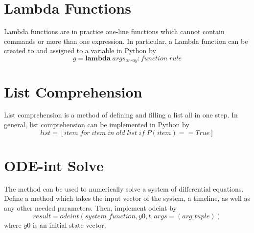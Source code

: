 \documentclass[12pt]{report}
\begin{document}
\begin{appendices}
        \section{Lambda Functions}

        \begin{defn}{}{}
                Lambda functions are in practice one-line functions which cannot contain commands or more than one expression. In particular, a Lambda function can be created to and assigned to a variable in Python by \begin{equation}
                        g = \mathbf{lambda}\;args_{array}:function\;rule
                \end{equation}
        \end{defn}


        \section{List Comprehension}

        \begin{defn}{}{}
                List comprehension is a method of defining and filling a list all in one step. In general, list comprehension can be implemented in Python by \begin{equation}
                        list = [item\;for\;item\;in\;old\;list\;if\;P(item) == True]
                \end{equation}
        \end{defn}

        \section{ODE-int Solve}

        \begin{defn}{}{}
                The  method can be used to numerically solve a system of differential equations. Define a method which takes the input vector of the system, a timeline, as well as any other needed parameters. Then, implement odeint by \begin{equation}
                        result = odeint(system\_function, y0, t, args = (arg\_tuple))
                \end{equation}
                where $y0$ is an initial state vector.
        \end{defn}
\end{appendices}
\end{document}

